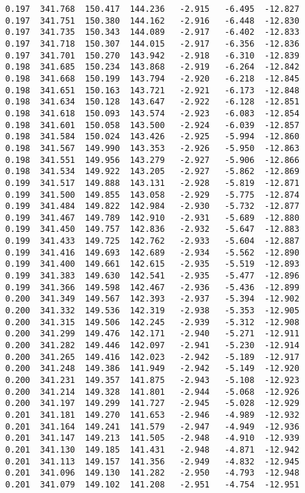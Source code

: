\begin{verbatim}
   0.197  341.768  150.417  144.236   -2.915   -6.495  -12.827
   0.197  341.751  150.380  144.162   -2.916   -6.448  -12.830
   0.197  341.735  150.343  144.089   -2.917   -6.402  -12.833
   0.197  341.718  150.307  144.015   -2.917   -6.356  -12.836
   0.197  341.701  150.270  143.942   -2.918   -6.310  -12.839
   0.198  341.685  150.234  143.868   -2.919   -6.264  -12.842
   0.198  341.668  150.199  143.794   -2.920   -6.218  -12.845
   0.198  341.651  150.163  143.721   -2.921   -6.173  -12.848
   0.198  341.634  150.128  143.647   -2.922   -6.128  -12.851
   0.198  341.618  150.093  143.574   -2.923   -6.083  -12.854
   0.198  341.601  150.058  143.500   -2.924   -6.039  -12.857
   0.198  341.584  150.024  143.426   -2.925   -5.994  -12.860
   0.198  341.567  149.990  143.353   -2.926   -5.950  -12.863
   0.198  341.551  149.956  143.279   -2.927   -5.906  -12.866
   0.198  341.534  149.922  143.205   -2.927   -5.862  -12.869
   0.199  341.517  149.888  143.131   -2.928   -5.819  -12.871
   0.199  341.500  149.855  143.058   -2.929   -5.775  -12.874
   0.199  341.484  149.822  142.984   -2.930   -5.732  -12.877
   0.199  341.467  149.789  142.910   -2.931   -5.689  -12.880
   0.199  341.450  149.757  142.836   -2.932   -5.647  -12.883
   0.199  341.433  149.725  142.762   -2.933   -5.604  -12.887
   0.199  341.416  149.693  142.689   -2.934   -5.562  -12.890
   0.199  341.400  149.661  142.615   -2.935   -5.519  -12.893
   0.199  341.383  149.630  142.541   -2.935   -5.477  -12.896
   0.199  341.366  149.598  142.467   -2.936   -5.436  -12.899
   0.200  341.349  149.567  142.393   -2.937   -5.394  -12.902
   0.200  341.332  149.536  142.319   -2.938   -5.353  -12.905
   0.200  341.315  149.506  142.245   -2.939   -5.312  -12.908
   0.200  341.299  149.476  142.171   -2.940   -5.271  -12.911
   0.200  341.282  149.446  142.097   -2.941   -5.230  -12.914
   0.200  341.265  149.416  142.023   -2.942   -5.189  -12.917
   0.200  341.248  149.386  141.949   -2.942   -5.149  -12.920
   0.200  341.231  149.357  141.875   -2.943   -5.108  -12.923
   0.200  341.214  149.328  141.801   -2.944   -5.068  -12.926
   0.200  341.197  149.299  141.727   -2.945   -5.028  -12.929
   0.201  341.181  149.270  141.653   -2.946   -4.989  -12.932
   0.201  341.164  149.241  141.579   -2.947   -4.949  -12.936
   0.201  341.147  149.213  141.505   -2.948   -4.910  -12.939
   0.201  341.130  149.185  141.431   -2.948   -4.871  -12.942
   0.201  341.113  149.157  141.356   -2.949   -4.832  -12.945
   0.201  341.096  149.130  141.282   -2.950   -4.793  -12.948
   0.201  341.079  149.102  141.208   -2.951   -4.754  -12.951

\end{verbatim}
